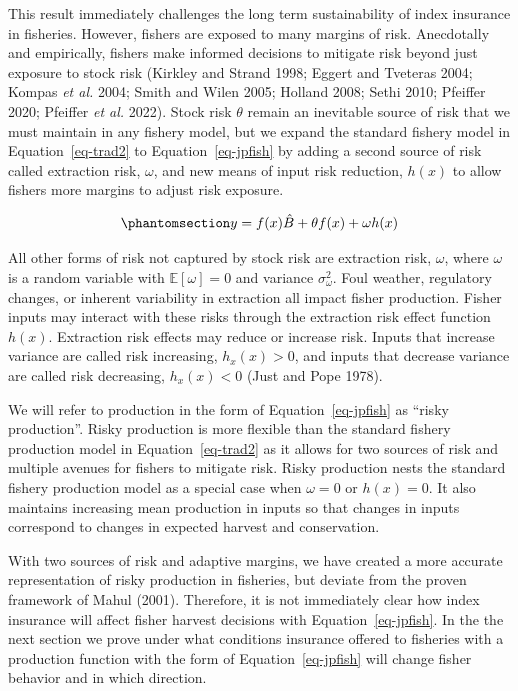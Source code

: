 \documentclass[
  letterpaper,
  DIV=11,
  numbers=noendperiod]{scrartcl}
\theoremstyle{plain}
\theoremstyle{plain}
\theoremstyle{remark}
\begin{document}
This result immediately challenges the long term sustainability of index
insurance in fisheries. However, fishers are exposed to many margins of
risk. Anecdotally and empirically, fishers make informed decisions to
mitigate risk beyond just exposure to stock risk (Kirkley and Strand
1998; Eggert and Tveteras 2004; Kompas \emph{et al.} 2004; Smith and
Wilen 2005; Holland 2008; Sethi 2010; Pfeiffer 2020; Pfeiffer \emph{et
al.} 2022). Stock risk \(\theta\) remain an inevitable source of risk
that we must maintain in any fishery model, but we expand the standard
fishery model in Equation~\ref{eq-trad2} to Equation~\ref{eq-jpfish} by
adding a second source of risk called extraction risk, \(\omega\), and
new means of input risk reduction, \(h(x)\) to allow fishers more
margins to adjust risk exposure.

\begin{equation}\phantomsection\label{eq-jpfish}{
y=f(x)\hat{B}+\theta f(x)+\omega h(x)
}\end{equation}

All other forms of risk not captured by stock risk are extraction risk,
\(\omega\), where \(\omega\) is a random variable with
\(\mathbb{E}[\omega]=0\) and variance \(\sigma_\omega^2\). Foul weather,
regulatory changes, or inherent variability in extraction all impact
fisher production. Fisher inputs may interact with these risks through
the extraction risk effect function \(h(x)\). Extraction risk effects
may reduce or increase risk. Inputs that increase variance are called
risk increasing, \(h_x(x)>0\), and inputs that decrease variance are
called risk decreasing, \(h_x(x)<0\) (Just and Pope 1978).

We will refer to production in the form of Equation~\ref{eq-jpfish} as
``risky production''. Risky production is more flexible than the
standard fishery production model in Equation~\ref{eq-trad2} as it
allows for two sources of risk and multiple avenues for fishers to
mitigate risk. Risky production nests the standard fishery production
model as a special case when \(\omega=0\) or \(h(x)=0\). It also
maintains increasing mean production in inputs so that changes in inputs
correspond to changes in expected harvest and conservation.

With two sources of risk and adaptive margins, we have created a more
accurate representation of risky production in fisheries, but deviate
from the proven framework of Mahul (2001). Therefore, it is not
immediately clear how index insurance will affect fisher harvest
decisions with Equation~\ref{eq-jpfish}. In the the next section we
prove under what conditions insurance offered to fisheries with a
production function with the form of Equation~\ref{eq-jpfish} will
change fisher behavior and in which direction.
\end{document}
